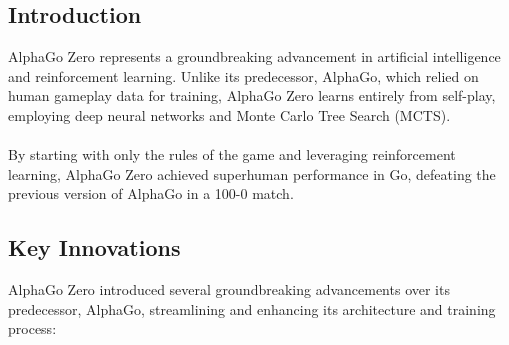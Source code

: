\subsection{Introduction}
AlphaGo Zero represents a groundbreaking advancement in artificial intelligence
and reinforcement learning. Unlike its predecessor, AlphaGo, which relied on
human gameplay data for training, AlphaGo Zero learns entirely from self-play,
employing deep neural networks and Monte Carlo Tree Search (MCTS). \cite{agz1}
\\\\ By starting with only the rules of the game and leveraging reinforcement
learning, AlphaGo Zero achieved superhuman performance in Go, defeating the
previous version of AlphaGo in a 100-0 match.
\subsection{Key Innovations}

AlphaGo Zero introduced several groundbreaking advancements over its
predecessor, AlphaGo, streamlining and enhancing its architecture and training
process:

